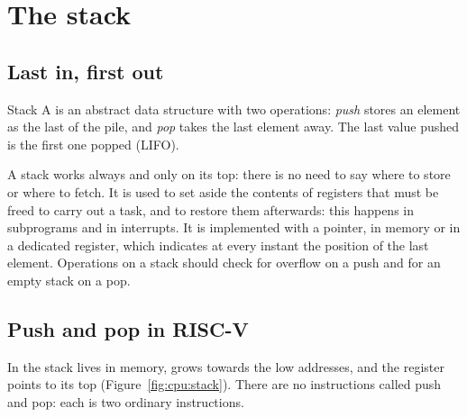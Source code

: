 \section{The stack}

\subsection{Last in, first out}

\begin{definition}{Stack}
A  is an abstract data structure with two operations: \emph{push}
stores an element as the last of the pile, and \emph{pop} takes the last
element away. The last value pushed is the first one popped (LIFO).
\end{definition}

A stack works always and only on its top: there is no need to say where to
store or where to fetch. It is used to set aside the contents of registers
that must be freed to carry out a task, and to restore them afterwards: this
happens in subprograms and in interrupts. It is implemented with a pointer,
in memory or in a dedicated register, which indicates at every instant the
position of the last element. Operations on a stack should check for overflow
on a push and for an empty stack on a pop.

\subsection{Push and pop in RISC-V}

In \riscv the stack lives in memory, grows towards the low addresses, and the
register  points to its top (Figure~\ref{fig:cpu:stack}). There are
no instructions called push and pop: each is two ordinary instructions.

